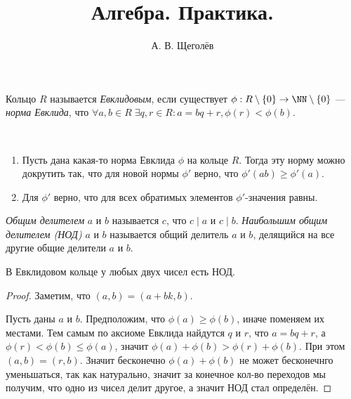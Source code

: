 \documentclass[12pt,a4paper]{article}
\title{Алгебра. Практика.}
\author{А. В. Щеголёв}
\date{}
\begin{document}
    \maketitle

    \begin{definition}
        Кольцо $R$ называется \emph{Евклидовым}, если существует $\phi: R\setminus \{0\} \to \NN \setminus \{0\}$ --- \emph{норма Евклида}, что $\forall a, b \in R\; \exists q, r \in R: a = bq + r, \phi(r) < \phi(b)$.
    \end{definition}

    \begin{exercise}\ 
        \begin{enumerate}
            \item Пусть дана какая-то норма Евклида $\phi$ на кольце $R$. Тогда эту норму можно докрутить так, что для новой нормы $\phi'$ верно, что $\phi'(ab) \geqslant \phi'(a)$.
            \item Для $\phi'$ верно, что для всех обратимых элементов $\phi'$-значения равны.
        \end{enumerate}
    \end{exercise}

    \begin{definition}
        \emph{Общим делителем} $a$ и $b$ называется $c$, что $c \mid a$ и $c \mid b$. \emph{Наибольшим общим делителем (НОД)} $a$ и $b$ называется общий делитель $a$ и $b$, делящийся на все другие общие делители $a$ и $b$.
    \end{definition}

    \begin{theorem}
        В Евклидовом кольце у любых двух чисел есть НОД.
    \end{theorem}

    \begin{proof}
        Заметим, что $(a, b) = (a + bk, b)$.
        
        Пусть даны $a$ и $b$. Предположим, что $\phi(a) \geqslant \phi(b)$, иначе поменяем их местами. Тем самым по аксиоме Евклида найдутся $q$ и $r$, что $a = bq + r$, а $\phi(r) < \phi(b) \leqslant \phi(a)$, значит $\phi(a) + \phi(b) > \phi(r) + \phi(b)$. При этом $(a, b) = (r, b)$. Значит бесконечно $\phi(a) + \phi(b)$ не может бесконечнго уменьшаться, так как натурально, значит за конечное кол-во переходов мы получим, что одно из чисел делит другое, а значит НОД стал определён.
    \end{proof}
\end{document}
